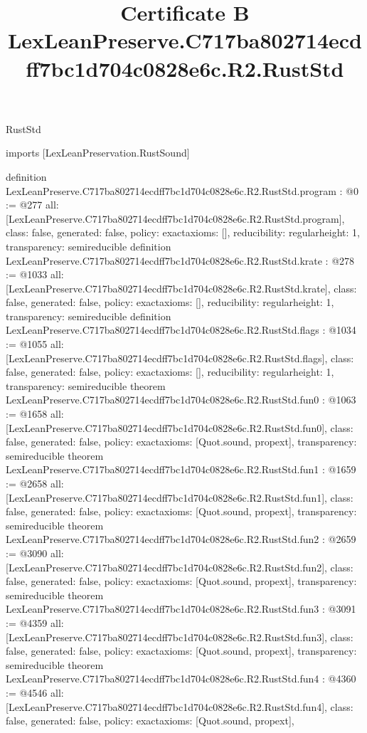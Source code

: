 \begin{lexlean}{RustStd}
\title{Certificate B LexLeanPreserve.C717ba802714ecdff7bc1d704c0828e6c.R2.RustStd}
\begin{coremodule}
imports [LexLeanPreservation.RustSound]

definition LexLeanPreserve.C717ba802714ecdff7bc1d704c0828e6c.R2.RustStd.program : @0 := @277 {
  all: [LexLeanPreserve.C717ba802714ecdff7bc1d704c0828e6c.R2.RustStd.program],
  class: false,
  generated: false,
  policy: exact{axioms: []},
  reducibility: regular{height: 1},
  transparency: semireducible
}
definition LexLeanPreserve.C717ba802714ecdff7bc1d704c0828e6c.R2.RustStd.krate : @278 := @1033 {
  all: [LexLeanPreserve.C717ba802714ecdff7bc1d704c0828e6c.R2.RustStd.krate],
  class: false,
  generated: false,
  policy: exact{axioms: []},
  reducibility: regular{height: 1},
  transparency: semireducible
}
definition LexLeanPreserve.C717ba802714ecdff7bc1d704c0828e6c.R2.RustStd.flags : @1034 := @1055 {
  all: [LexLeanPreserve.C717ba802714ecdff7bc1d704c0828e6c.R2.RustStd.flags],
  class: false,
  generated: false,
  policy: exact{axioms: []},
  reducibility: regular{height: 1},
  transparency: semireducible
}
theorem LexLeanPreserve.C717ba802714ecdff7bc1d704c0828e6c.R2.RustStd.fun0 : @1063 := @1658 {
  all: [LexLeanPreserve.C717ba802714ecdff7bc1d704c0828e6c.R2.RustStd.fun0],
  class: false,
  generated: false,
  policy: exact{axioms: [Quot.sound, propext]},
  transparency: semireducible
}
theorem LexLeanPreserve.C717ba802714ecdff7bc1d704c0828e6c.R2.RustStd.fun1 : @1659 := @2658 {
  all: [LexLeanPreserve.C717ba802714ecdff7bc1d704c0828e6c.R2.RustStd.fun1],
  class: false,
  generated: false,
  policy: exact{axioms: [Quot.sound, propext]},
  transparency: semireducible
}
theorem LexLeanPreserve.C717ba802714ecdff7bc1d704c0828e6c.R2.RustStd.fun2 : @2659 := @3090 {
  all: [LexLeanPreserve.C717ba802714ecdff7bc1d704c0828e6c.R2.RustStd.fun2],
  class: false,
  generated: false,
  policy: exact{axioms: [Quot.sound, propext]},
  transparency: semireducible
}
theorem LexLeanPreserve.C717ba802714ecdff7bc1d704c0828e6c.R2.RustStd.fun3 : @3091 := @4359 {
  all: [LexLeanPreserve.C717ba802714ecdff7bc1d704c0828e6c.R2.RustStd.fun3],
  class: false,
  generated: false,
  policy: exact{axioms: [Quot.sound, propext]},
  transparency: semireducible
}
theorem LexLeanPreserve.C717ba802714ecdff7bc1d704c0828e6c.R2.RustStd.fun4 : @4360 := @4546 {
  all: [LexLeanPreserve.C717ba802714ecdff7bc1d704c0828e6c.R2.RustStd.fun4],
  class: false,
  generated: false,
  policy: exact{axioms: [Quot.sound, propext]},
}
\end{coremodule}
\end{lexlean}
